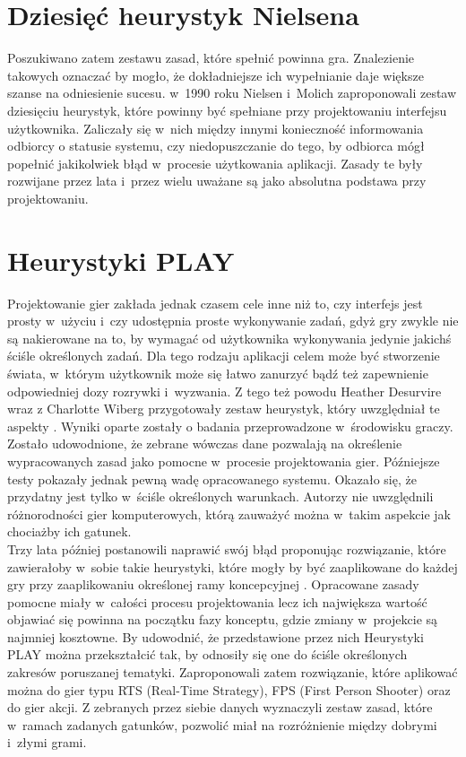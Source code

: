 \documentclass[a4paper,12pt,numbers=noenddot]{report}
\begin{document}
\section{Dziesięć heurystyk Nielsena}
Poszukiwano zatem zestawu zasad, które spełnić powinna gra. Znalezienie takowych oznaczać by mogło, że dokładniejsze ich wypełnianie daje większe szanse na odniesienie sucesu. w~1990 roku Nielsen i~Molich \cite{art_Nielsen} zaproponowali zestaw dziesięciu heurystyk, które powinny być spełniane przy projektowaniu interfejsu użytkownika. Zaliczały się w~nich między innymi konieczność informowania odbiorcy o statusie systemu, czy niedopuszczanie do tego, by odbiorca mógł popełnić jakikolwiek błąd w~procesie użytkowania aplikacji. Zasady te były rozwijane przez lata i~przez wielu uważane są jako absolutna podstawa przy projektowaniu. 

\section{Heurystyki PLAY}
Projektowanie gier zakłada jednak czasem cele inne niż to, czy interfejs jest prosty w~użyciu i~czy udostępnia proste wykonywanie zadań, gdyż gry zwykle nie są nakierowane na to, by wymagać od użytkownika wykonywania jedynie jakichś ściśle określonych zadań. Dla tego rodzaju aplikacji celem może być stworzenie świata, w~którym użytkownik może się łatwo zanurzyć bądź też zapewnienie odpowiedniej dozy rozrywki i~wyzwania. Z tego też powodu Heather Desurvire wraz z Charlotte Wiberg przygotowały zestaw heurystyk, który uwzględniał te aspekty \cite{art_PLAY1}. Wyniki oparte zostały o badania przeprowadzone w~środowisku graczy. Zostało udowodnione, że zebrane wówczas dane pozwalają na określenie wypracowanych zasad jako pomocne w~procesie projektowania gier. Późniejsze testy pokazały jednak pewną wadę opracowanego systemu. Okazało się, że przydatny jest tylko w~ściśle określonych warunkach. Autorzy nie uwzględnili różnorodności gier komputerowych, którą zauważyć można w~takim aspekcie jak chociażby ich gatunek. \\
Trzy lata później postanowili naprawić swój błąd proponując rozwiązanie, które zawierałoby w~sobie takie heurystyki, które mogły by być zaaplikowane do każdej gry przy zaaplikowaniu określonej ramy koncepcyjnej \cite{art_PLAY2}. Opracowane zasady pomocne miały w~całości procesu projektowania lecz ich największa wartość objawiać się powinna na początku fazy konceptu, gdzie zmiany w~projekcie są najmniej kosztowne. By udowodnić, że przedstawione przez nich Heurystyki PLAY można przekształcić tak, by odnosiły się one do ściśle określonych zakresów poruszanej tematyki. Zaproponowali zatem rozwiązanie, które aplikować można do gier typu RTS (Real-Time Strategy), FPS (First Person Shooter) oraz do gier akcji. Z zebranych przez siebie danych wyznaczyli zestaw zasad, które w~ramach zadanych gatunków, pozwolić miał na rozróżnienie między dobrymi i~złymi grami. 
\end{document}
